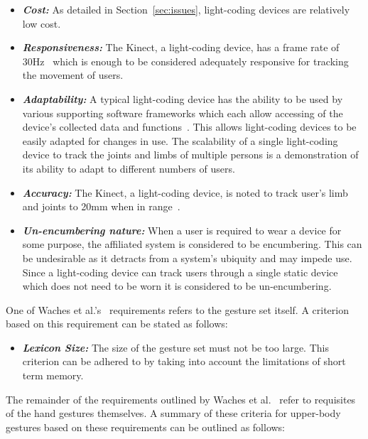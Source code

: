 \documentclass[link]{IWCOMP}
\begin{document}
\begin{itemize}
\item  \textit{\textbf{Cost:}} As detailed in Section~\ref{sec:issues}, light-coding devices are relatively low cost.
\item \textit{\textbf{Responsiveness:}} The Kinect, a light-coding device, has a frame rate of 30Hz~\citep{Livingston2012} which is enough to be considered adequately responsive for tracking the movement of users.
\item \textit{\textbf{Adaptability:}} A typical light-coding device has the ability to be used by various supporting software frameworks which each allow accessing of the device's collected data and functions~\citep{Goth2011}.
This allows light-coding devices to be easily adapted for changes in use.
The scalability of a single light-coding device to track the joints and limbs of multiple persons is a demonstration of its ability to adapt to different numbers of users.
\item \textit{\textbf{Accuracy:}} The Kinect, a light-coding device, is noted to track user's limb and joints to 20mm when in range~\citep{Marquardt2011}.
\item \textit{\textbf{Un-encumbering nature:}} When a user is required to wear a device for some purpose, the affiliated system is considered to be encumbering.
This can be undesirable as it detracts from a system's ubiquity and may impede use. 
Since a light-coding device can track users through a single static device which does not need to be worn it is considered to be un-encumbering.\\ 
\end{itemize}

One of Waches et al.'s~\citeyearpar{Wachs2011} requirements refers to the gesture set itself.
A criterion based on this requirement can be stated as follows:

\begin{itemize}
\item \textit{\textbf{Lexicon Size:}} The size of the gesture set must not be too large.
This criterion can be adhered to by taking into account the limitations of short term memory.\\ 
\end{itemize}

The remainder of the requirements outlined by Waches et al.~\citeyearpar{Wachs2011} refer to requisites of the hand gestures themselves.
A summary of these criteria for upper-body gestures based on these requirements can be outlined as follows:
\end{document}
